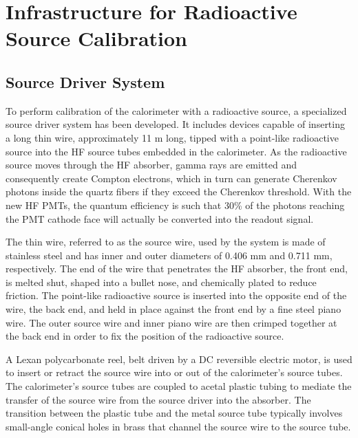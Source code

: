 \section{Infrastructure for Radioactive Source Calibration}\label{section:hf_experimentalsetup}

\subsection{Source Driver System}
To perform calibration of the calorimeter with a radioactive source, a
specialized source driver system has been developed. It includes devices capable of inserting a long thin wire, approximately 11 m long, tipped with a point-like radioactive source into the HF source tubes embedded in the calorimeter. As the radioactive source moves through the HF absorber, gamma rays are emitted and consequently create Compton electrons, which in turn can generate Cherenkov photons inside the quartz fibers if they exceed the Cherenkov threshold. With the new HF PMTs, the quantum efficiency is such that 30\% of the photons reaching the PMT cathode face will actually be converted into the readout signal.

The thin wire, referred to as the source wire, used by the system is made of
stainless steel and has inner and outer diameters of 0.406 mm and 0.711 mm,
respectively. The end of the wire that penetrates the HF absorber, the front end,
is melted shut, shaped into a bullet nose, and chemically plated to reduce friction. The point-like radioactive source is inserted into the opposite end of
the wire, the back end, and held in place against the front end by a fine steel
piano wire. The outer source wire and inner piano wire are then crimped together at the back end in order to fix the position of the radioactive source.

A Lexan polycarbonate reel, belt driven by a DC reversible electric motor, is used
to insert or retract the source wire into or out of the calorimeter's source tubes.
The calorimeter's source tubes are coupled to acetal plastic tubing to mediate the
transfer of the source wire from the source driver into the absorber. The
transition between the plastic tube and the metal source tube typically involves
small-angle conical holes in brass that channel the source wire to the source tube.

